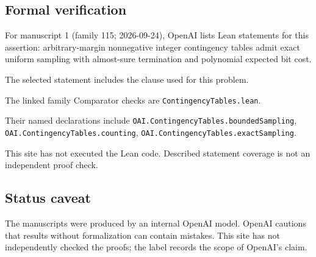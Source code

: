 \documentclass[11pt]{article}
\begin{document}
\subsection{Formal verification}
For manuscript 1 (family 115; 2026-09-24), OpenAI lists Lean statements for this assertion: arbitrary-margin nonnegative integer contingency tables admit exact uniform sampling with almost-sure termination and polynomial expected bit cost.

The selected statement includes the clause used for this problem.

The linked family Comparator checks are \texttt{ContingencyTables.lean}.

Their named declarations include \texttt{OAI.ContingencyTables.boundedSampling}, \texttt{OAI.ContingencyTables.counting}, \texttt{OAI.ContingencyTables.exactSampling}.

This site has not executed the Lean code. Described statement coverage is not an independent proof check.

\subsection{Status caveat}
The manuscripts were produced by an internal OpenAI model. OpenAI cautions that results without formalization can contain mistakes. This site has not independently checked the proofs; the label records the scope of OpenAI's claim.
\end{document}
